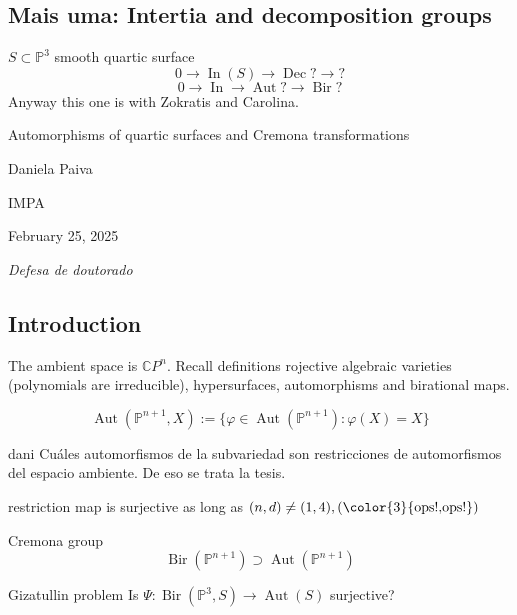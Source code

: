 \subsection{Mais uma: Intertia and decomposition groups}
\(S \subset \mathbb{P}^3\) smooth quartic surface
\[0 \to \operatorname{ I n}(S) \to \operatorname{ D e c}? \to ?\]
\[0 \to \operatorname{ I n} \to \operatorname{Aut}? \to \operatorname{Bir}?\]
Anyway this one is with Zokratis and Carolina.
\clearpage{}
{\Huge Automorphisms of quartic surfaces and Cremona transformations}

\hfill{\Large Daniela Paiva}

{\Large \hfill IMPA}

\hfill{\large February 25, 2025

\hfill \textit{Defesa de doutorado}}

\subsection{Introduction}

The ambient space is \(\mathbb{C}P^{n}\). Recall definitions rojective algebraic varieties (polynomials are irreducible), hypersurfaces, automorphisms and birational maps.

\[\operatorname{Aut}(\mathbb{P}^{n+1},X):=\{ \varphi\in \operatorname{Aut}(\mathbb{P}^{n+1}):\varphi(X)=X\}\]

\begin{thing7}{dani}\leavevmode
Cuáles automorfismos de la subvariedad son restricciones de automorfismos del espacio ambiente. De eso se trata la tesis.
\end{thing7}

\begin{thm}\leavevmode
restriction map is surjective as long as \((n,d) \neq (1,4), ({\color{3}{\text{ops!,ops!} }})\)
\end{thm}

Cremona group
\[\operatorname{Bir}(\mathbb{P}^{n+1}) \supset\operatorname{Aut}(\mathbb{P}^{n+1})\]

\begin{thing7}{Gizatullin problem}\leavevmode
Is \(\Psi: \operatorname{Bir}(\mathbb{P}^3,S) \longrightarrow \operatorname{Aut}(S)\) surjective?
\end{thing7}

